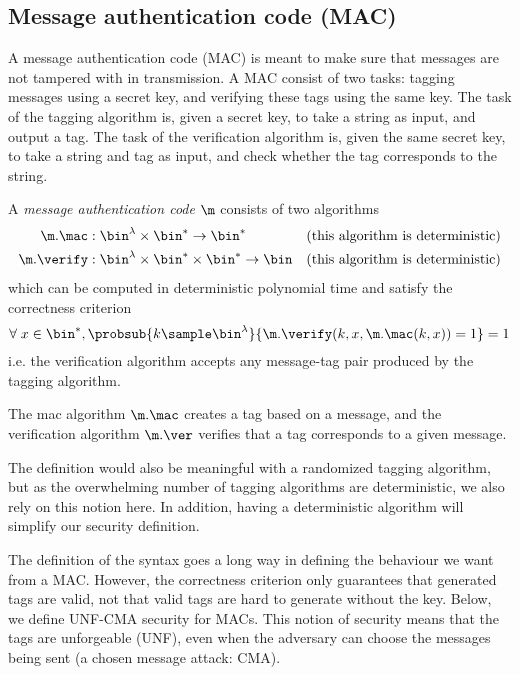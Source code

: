 \newpage
\subsection{Message authentication code (MAC)}\label{ssec:mac-definition}
A message authentication code (MAC) is meant to make sure that messages are not tampered with in transmission. A MAC consist of two tasks: tagging messages using a secret key, and verifying these tags using the same key. The task of the tagging algorithm is, given a secret key, to take a string as input, and output a tag. The task of the verification algorithm is, given the same secret key, to take a string and tag as input, and check whether the tag corresponds to the string.

\begin{syntax}\label{syntax:mac}
  A \emph{message authentication code} $\m$ consists of two algorithms
  \begin{align*}
    \m.\mac    & : \bin^\lambda \times \bin^* \rightarrow \bin^*             & \text{(this algorithm is deterministic)} \\
    \m.\verify & : \bin^\lambda \times \bin^* \times \bin^* \rightarrow \bin & \text{(this algorithm is deterministic)}
  \end{align*}
  which can be computed in deterministic polynomial time and satisfy the correctness criterion
  \[\forall\;x\in\bin^*, \probsub{k\sample\bin^\lambda}{\m.\verify(k,x,\m.\mac(k,x))=1}=1\]
  i.e. the verification algorithm accepts any message-tag pair produced by the tagging algorithm.
\end{syntax}

\begin{remark}
  The mac algorithm $\m.\mac$ creates a tag based on a message, and the verification algorithm $\m.\ver$ verifies that a tag corresponds to a given message.
\end{remark}

\begin{remark}
  The definition would also be meaningful with a randomized tagging algorithm, but as the overwhelming number of tagging algorithms are deterministic, we also rely on this notion here. In addition, having a deterministic algorithm will simplify our security definition.
\end{remark}

\begin{remark} The definition of the syntax goes a long way in defining the behaviour we want from a MAC. However, the correctness criterion only guarantees that generated tags are valid, not that valid tags are hard to generate without the key. Below, we define UNF-CMA security for MACs. This notion of security means that the tags are unforgeable (UNF), even when the adversary can choose the messages being sent (a chosen message attack: CMA).
\end{remark}


